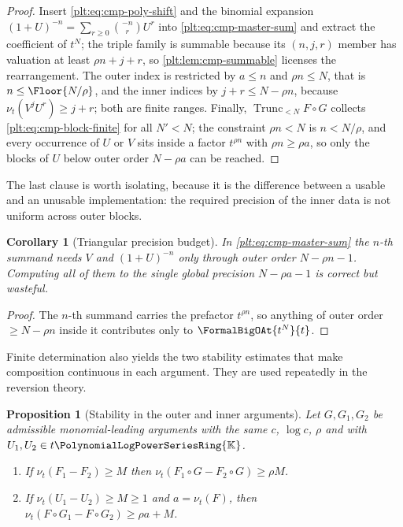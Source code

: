 \documentclass[11pt,oneside]{article}
\theoremstyle{plain}
\newtheorem{proposition}[theorem]{Proposition}
\newtheorem{corollary}[theorem]{Corollary}
\theoremstyle{definition}
\theoremstyle{remark}
\newcommand{\K}{\mathbb{K}}
\newcommand{\PLpow}{\PolynomialLogPowerSeriesRing{\K}}   %
\newcommand{\ordt}{\nu_{t}}                              %
\newcommand{\Trunc}[2]{\operatorname{Trunc}_{<#2}#1}     %
\newcommand{\compose}{\mathbin{\circ}}
\begin{document}
\begin{proof}
Insert \eqref{plt:eq:cmp-poly-shift} and the binomial expansion
\((1+U)^{-n}=\sum_{r\ge0}\binom{-n}{r}U^{r}\) into
\eqref{plt:eq:cmp-master-sum} and extract the coefficient of \(t^{N}\); the
triple family is summable because its \((n,j,r)\) member has valuation at
least \(\rho n+j+r\), so \cref{plt:lem:cmp-summable} licenses the
rearrangement.  The outer index is restricted by \(a\le n\) and
\(\rho n\le N\), that is \(n\le\Floor{N/\rho}\), and the inner indices by
\(j+r\le N-\rho n\), because \(\ordt(V^jU^r)\ge j+r\); both are finite ranges.
Finally, \(\Trunc{F\compose G}{N}\) collects
\eqref{plt:eq:cmp-block-finite} for all \(N'<N\); the constraint
\(\rho n<N\) is \(n<N/\rho\), and every occurrence of \(U\) or \(V\) sits
inside a factor \(t^{\rho n}\) with \(\rho n\ge\rho a\), so only the blocks of
\(U\) below outer order \(N-\rho a\) can be reached.
\end{proof}

The last clause is worth isolating, because it is the difference between a
usable and an unusable implementation: the required precision of the inner
data is not uniform across outer blocks.

\begin{corollary}[Triangular precision budget]
\label{plt:cor:cmp-precision-budget}
In \eqref{plt:eq:cmp-master-sum} the \(n\)-th summand needs \(V\) and
\((1+U)^{-n}\) only through outer order \(N-\rho n-1\).  Computing all of them
to the single global precision \(N-\rho a-1\) is correct but wasteful.
\end{corollary}

\begin{proof}
The \(n\)-th summand carries the prefactor \(t^{\rho n}\), so anything of
outer order \(\ge N-\rho n\) inside it contributes only to
\(\FormalBigOAt{t^{N}}{t}\).
\end{proof}

Finite determination also yields the two stability estimates that make
composition continuous in each argument.  They are used repeatedly in the
reversion theory.

\begin{proposition}[Stability in the outer and inner arguments]
\label{plt:prop:cmp-stability}
Let \(G,G_1,G_2\) be admissible monomial-leading arguments with the same
\(c\), \(\log c\), \(\rho\) and with \(U_1,U_2\in t\PLpow\).
\begin{enumerate}
\item If \(\ordt(F_1-F_2)\ge M\) then
\(\ordt(F_1\compose G-F_2\compose G)\ge\rho M\).
\item If \(\ordt(U_1-U_2)\ge M\ge1\) and \(a=\ordt(F)\), then
\(\ordt(F\compose G_1-F\compose G_2)\ge\rho a+M\).
\end{enumerate}
\end{proposition}
\end{document}

